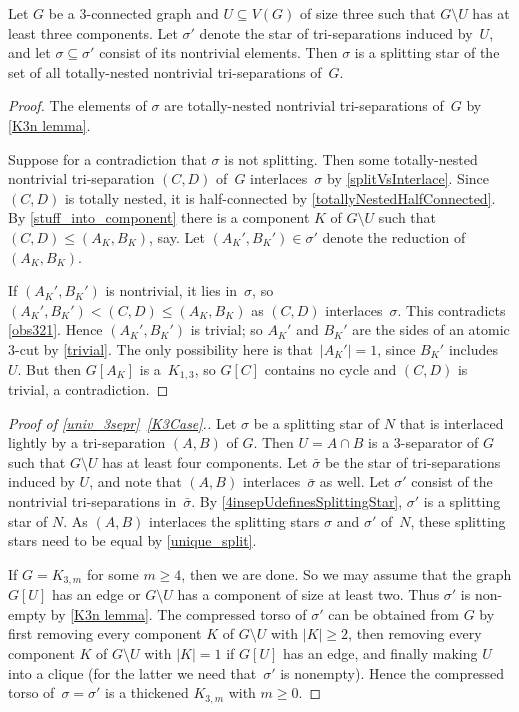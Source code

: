 \documentclass{aic}
\newcommand{\se}{\subseteq}
\theoremstyle{plain}
\theoremstyle{definition}
\theoremstyle{plain}
\theoremstyle{plain}
\newcommand{\sm}{\setminus}
\renewcommand{\leq}{\leqslant}
\renewcommand{\geq}{\geqslant}
\renewcommand{\le}{\leqslant}
\renewcommand{\ge}{\geqslant}
\begin{document}
\begin{lem}\label{4insepUdefinesSplittingStar}
Let $G$ be a 3-connected graph and $U\se V(G)$ of size three such that $G\sm U$ has at least three components.
Let $\sigma'$ denote the star of tri-separations induced by~$U$, and let $\sigma\se\sigma'$ consist of its nontrivial elements.
Then $\sigma$ is a splitting star of the set of all totally-nested nontrivial tri-separations of~$G$.
\end{lem}
\begin{proof}
The elements of $\sigma$ are totally-nested nontrivial tri-separations of~$G$ by \autoref{K3n lemma}.

Suppose for a contradiction that $\sigma$ is not splitting.
Then some totally-nested nontrivial tri-separation $(C,D)$ of~$G$ interlaces~$\sigma$ by \autoref{splitVsInterlace}.
Since $(C,D)$ is totally nested, it is half-connected by \autoref{totallyNestedHalfConnected}.
By \autoref{stuff_into_component} there is a component $K$ of $G\sm U$ such that $(C,D)\leq (A_K,B_K)$, say.
Let $(A_K',B_K')\in\sigma'$ denote the reduction of~$(A_K,B_K)$.

If $(A_K',B_K')$ is nontrivial, it lies in~$\sigma$, so $(A_K',B_K')<(C,D)\le (A_K,B_K)$ as $(C,D)$ interlaces~$\sigma$.
This contradicts \autoref{obs321}.
Hence $(A_K',B_K')$ is trivial; so $A_K'$ and $B_K'$ are the sides of an atomic 3-cut by \autoref{trivial}.
The only possibility here is that~$|A_K'|=1$, since $B_K'$ includes~$U$.
But then $G[A_K]$ is a~$K_{1,3}$, so $G[C]$ contains no cycle and $(C,D)$ is trivial, a contradiction.
\end{proof}


\begin{proof}[Proof of \autoref{univ_3sepr}~\textnormal{\ref{K3Case}}.]
Let $\sigma$ be a splitting star of $N$ that is interlaced lightly by a tri-separation $(A,B)$ of $G$. 
Then $U=A\cap B$ is a 3-separator of $G$ such that $G\sm  U$ has at least four components. 
Let $\bar \sigma$ be the star of tri-separations induced by $U$, and note that $(A,B)$ interlaces~$\bar \sigma$ as well.
Let $\sigma'$ consist of the nontrivial tri-separations in~$\bar \sigma$.
By \autoref{4insepUdefinesSplittingStar}, $\sigma'$ is a splitting star of $N$. 
As $(A,B)$ interlaces the splitting stars $\sigma$ and $\sigma'$ of~$N$, these splitting stars need to be equal by \autoref{unique_split}.

If $G=K_{3,m}$ for some $m\ge 4$, then we are done.
So we may assume that the graph $G[U]$ has an edge or $G\sm U$ has a component of size at least two. 
Thus $\sigma'$ is non-empty by \autoref{K3n lemma}.
The compressed torso of $\sigma'$ can be obtained from $G$ by first removing every component $K$ of $G\sm U$ with $|K|\ge 2$, then removing every component $K$ of $G\sm U$ with $|K|=1$ if $G[U]$ has an edge, and finally making $U$ into a clique (for the latter we need that~$\sigma'$ is nonempty).
Hence the compressed torso of~$\sigma=\sigma'$ is a thickened $K_{3,m}$ with $m\geq 0$.
\end{proof}
\end{document}
